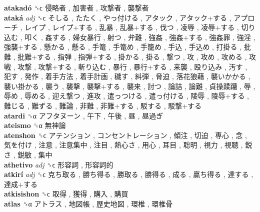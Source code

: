 \textbf{atakadó} ␝ϲ   侵略者 ,  加害者 ,  攻撃者 ,  襲撃者   \\
\textbf{ataká} \emph{adj}  ␝ϲ   そしる ,  たたく ,  やっ付ける ,  アタック ,  アタック+する ,  アプローチ ,  レイプ ,  レイプ+する ,  乱暴 ,  乱暴+する ,  伐つ ,  凌辱 ,  凌辱+する ,  切り込む ,  叩く ,  姦する ,  婦女暴行 ,  射つ ,  弁難 ,  強姦 ,  強姦+する ,  強姦罪 ,  強淫 ,  強襲+する ,  懸かる ,  懸る ,  手篭 ,  手篭め ,  手籠め ,  手込 ,  手込め ,  打掛る ,  批難 ,  批難+する ,  指弾 ,  指弾+する ,  掛かる ,  掛る ,  撃つ ,  攻 ,  攻め ,  攻める ,  攻戦 ,  攻撃 ,  攻撃+する ,  斬り込む ,  暴行 ,  暴行+する ,  来襲 ,  殴り込み ,  汚す ,  犯す ,  発作 ,  着手方法 ,  着手計画 ,  穢す ,  糾弾 ,  脅迫 ,  落花狼藉 ,  襲いかかる ,  襲い掛かる ,  襲う ,  襲撃 ,  襲撃+する ,  襲来 ,  討つ ,  論詰 ,  論難 ,  貞操蹂躪 ,  辱 ,  辱め ,  辱める ,  迎え撃つ ,  進攻 ,  遣っつける ,  遣っ付ける ,  陵辱 ,  陵辱+する ,  難じる ,  難ずる ,  難論 ,  非難 ,  非難+する ,  駁する ,  駁撃+する   \\
\textbf{atardi} ␝α   アフタヌーン ,  午下 ,  午後 ,  昼 ,  昼過ぎ   \\
\textbf{ateismo} ␝α   無神論   \\
\textbf{atenshon} ␝ϲ   アテンション ,  コンセントレーション ,  傾注 ,  切迫 ,  専心 ,  念 ,  気を付け ,  注意 ,  注意集中 ,  注目 ,  熱心さ ,  用心 ,  耳目 ,  聡明 ,  視力 ,  視聴 ,  鋭さ ,  鋭敏 ,  集中   \\
\textbf{athetivo} \emph{adj}  ␝ϲ   形容詞 ,  形容詞的   \\
\textbf{atkirí} \emph{adj}  ␝ϲ   克ち取る ,  勝ち得る ,  勝取る ,  勝得る ,  成る ,  贏ち得る ,  達する ,  達成+する   \\
\textbf{atkisishon} ␝ϲ   取得 ,  獲得 ,  購入 ,  購買   \\
\textbf{atlas} ␝α   アトラス ,  地図帳 ,  歴史地図 ,  環椎 ,  環椎骨   \\

